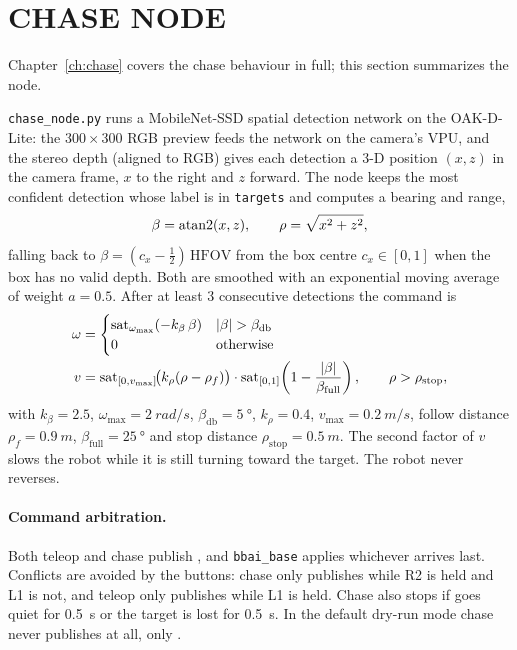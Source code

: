 \section{CHASE NODE}
\label{sec:chase}

Chapter~\ref{ch:chase} covers the chase behaviour in full; this section
summarizes the node.


\texttt{chase\_node.py} runs a MobileNet-SSD spatial detection network on the
OAK-D-Lite: the $300\times300$ RGB preview feeds the network on the camera's
VPU, and the stereo depth (aligned to RGB) gives each detection a 3-D position
$(x,z)$ in the camera frame, $x$ to the right and $z$ forward. The node keeps
the most confident detection whose label is in \texttt{targets} and computes a
bearing and range,
\begin{equation}
\beta = \operatorname{atan2}(x,z),\qquad \rho=\sqrt{x^2+z^2},
\end{equation}
falling back to $\beta=(c_x-\tfrac12)\,\mathrm{HFOV}$ from the box centre
$c_x\in[0,1]$ when the box has no valid depth. Both are smoothed with an
exponential moving average of weight $a=0.5$. After at least 3 consecutive
detections the command is
\begin{align}
\omega &= \begin{cases}
  \operatorname{sat}_{\omega_{\max}}\!\left(-k_\beta\,\beta\right) & \left\lvert \beta \right\rvert>\beta_{\mathrm{db}}\\
  0 & \text{otherwise}\end{cases}\\
v &= \operatorname{sat}_{[0,v_{\max}]}\!\bigl(k_\rho(\rho-\rho_f)\bigr)\cdot
     \operatorname{sat}_{[0,1]}\!\left(1-\frac{\left\lvert \beta \right\rvert}{\beta_{\mathrm{full}}}\right),
     \qquad \rho>\rho_{\mathrm{stop}},
\end{align}
with $k_\beta=2.5$, $\omega_{\max}=\SI{2}{rad/s}$,
$\beta_{\mathrm{db}}=\SI{5}{\degree}$, $k_\rho=0.4$, $v_{\max}=\SI{0.2}{m/s}$,
follow distance $\rho_f=\SI{0.9}{m}$, $\beta_{\mathrm{full}}=\SI{25}{\degree}$
and stop distance $\rho_{\mathrm{stop}}=\SI{0.5}{m}$. The second factor of $v$
slows the robot while it is still turning toward the target. The robot never
reverses.

\paragraph{Command arbitration.} Both teleop and chase publish
, and \texttt{bbai\_base} applies whichever arrives last.
Conflicts are avoided by the buttons: chase only publishes while R2 is held
and L1 is not, and teleop only publishes while L1 is held. Chase also stops
if  goes quiet for \SI{0.5}{s} or the target is lost for
\SI{0.5}{s}. In the default dry-run mode chase never publishes
 at all, only .
